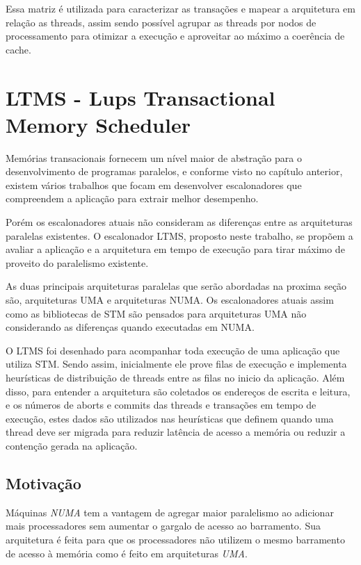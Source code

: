 \documentclass[diss,capa]{texufpel}
\begin{document}
Essa matriz é utilizada para caracterizar as transações e mapear a arquitetura em relação as threads, assim sendo possível agrupar as threads por nodos de processamento para otimizar a execução e aproveitar ao máximo a coerência de cache.

\chapter{LTMS - Lups Transactional Memory Scheduler}
\label{chapter::ltms}

Memórias transacionais fornecem um nível maior de abstração para o desenvolvimento de programas paralelos, e conforme visto no capítulo anterior, existem vários trabalhos que focam em desenvolver escalonadores que compreendem a aplicação para extrair melhor desempenho.

Porém os escalonadores atuais não consideram as diferenças entre as arquiteturas paralelas existentes. O escalonador LTMS, proposto neste trabalho, se propõem a avaliar a aplicação e a arquitetura em tempo de execução para tirar máximo de proveito do paralelismo existente.

As duas principais arquiteturas paralelas que serão abordadas na proxima seção são, arquiteturas UMA e arquiteturas NUMA. Os escalonadores atuais assim como as bibliotecas de STM são pensados para arquiteturas UMA não considerando as diferenças quando executadas em NUMA.

O LTMS foi desenhado para acompanhar toda execução de uma aplicação que utiliza STM. Sendo assim, inicialmente ele prove filas de execução e implementa heurísticas de distribuição de threads entre as filas no inicio da aplicação. Além disso, para entender a arquitetura são coletados os endereços de escrita e leitura, e os números de aborts e commits das threads e transações em tempo de execução, estes dados são utilizados nas heurísticas que definem quando uma thread deve ser migrada para reduzir latência de acesso a memória ou reduzir a contenção gerada na aplicação.

\section{\textbf{Motivação}}

Máquinas \emph{NUMA} tem a vantagem de agregar maior paralelismo ao adicionar mais processadores sem aumentar o gargalo de acesso ao barramento. Sua arquitetura é feita para que os processadores não utilizem o mesmo barramento de acesso à memória como é feito em arquiteturas \emph{UMA}.
\end{document}
